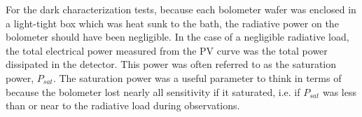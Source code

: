 %
%



For the dark characterization tests, because each bolometer wafer was enclosed in a light-tight box which was heat sunk to the bath, the radiative power on the bolometer should have been negligible. 
In the case of a negligible radiative load, the total electrical power measured from the PV curve was the total power dissipated in the detector. 
This power was often referred to as the saturation power, $P_{sat}$. 
The saturation power was a useful parameter to think in terms of because the bolometer lost nearly all sensitivity if it saturated, i.e. if $P_{sat}$ was less than or near to the radiative load during observations. 


